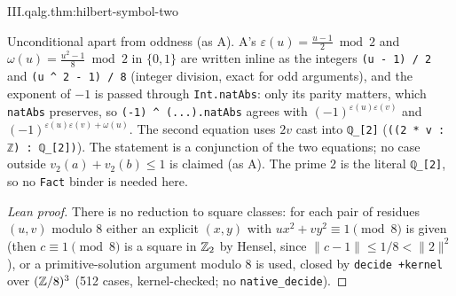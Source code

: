 \begin{theorem}
\end{theorem}
\begin{tfformal}{III.qalg.thm:hilbert-symbol-two}
\begin{tffidelity}
Unconditional apart from oddness (as A). A's $\varepsilon(u)=\frac{u-1}{2}\bmod2$ and $\omega(u)=\frac{u^2-1}{8}\bmod2$ in $\{0,1\}$ are written inline as the integers \texttt{(u - 1) / 2} and \texttt{(u \textasciicircum{} 2 - 1) / 8} (integer division, exact for odd arguments), and the exponent of $-1$ is passed through \texttt{Int.natAbs}: only its parity matters, which \texttt{natAbs} preserves, so \texttt{(-1) \textasciicircum{} (...).natAbs} agrees with $(-1)^{\varepsilon(u)\varepsilon(v)}$ and $(-1)^{\varepsilon(u)\varepsilon(v)+\omega(u)}$. The second equation uses $2v$ cast into \texttt{ℚ\_[2]} (\texttt{((2 * v : ℤ) : ℚ\_[2])}). The statement is a conjunction of the two equations; no case outside $v_2(a)+v_2(b)\le1$ is claimed (as A). The prime $2$ is the literal \texttt{ℚ\_[2]}, so no \texttt{Fact} binder is needed here.
\end{tffidelity}
\end{tfformal}
\begin{proof}[Lean proof]
There is no reduction to square classes: for each pair of residues $(u,v)$ modulo $8$ either an explicit $(x,y)$ with $ux^2+vy^2\equiv1\pmod 8$ is given (then $c\equiv1\pmod 8$ is a square in $\mathbb{Z}_2$ by Hensel, since $\|c-1\|\le1/8<\|2\|^2$), or a primitive-solution argument modulo $8$ is used, closed by \texttt{decide +kernel} over $(\mathbb{Z}/8)^3$ (512 cases, kernel-checked; no \texttt{native\_decide}).
\end{proof}

